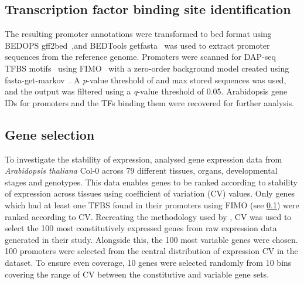 \subsection{Transcription factor binding site identification}
\label{chapter1:methods:transcription-factor-binding-site-identification}

The resulting promoter annotations were transformed to bed format using BEDOPS gff2bed~\autocite{nephBEDOPSHighperformanceGenomic2012},and BEDTools getfasta~\autocite{quinlanBEDToolsFlexibleSuite2010} was used to extract promoter sequences from the reference genome.
Promoters were scanned for DAP\hyp{}seq TFBS motifs~\autocite{omalleyCistromeEpicistromeFeatures2016} using FIMO~\autocite{grantFIMOScanningOccurrences2011} with a zero\hyp{}order background model created using fasta\hyp{}get\hyp{}markov~\autocite{baileyMEMESuiteTools2009}.
A \textit{p}\hyp{}value threshold of  and max stored sequences  was used, and the output was filtered using a \textit{q}\hyp{}value threshold of 0.05.
Arabidopsis gene IDs for promoters and the TFs binding them were recovered for further analysis.

\subsection{Gene selection}\label{chapter1:methods:gene-selection}

To investigate the stability of expression, \textcite*{czechowskiGenomeWideIdentificationTesting2005} analysed gene expression data from \textit{Arabidopsis thaliana} Col-0 across 79 different tissues, organs, developmental stages and genotypes.
This data enables genes to be ranked according to stability of expression across tissues using coefficient of variation (CV) values.
Only genes which had at least one TFBS found in their promoters using FIMO (see \ref{chapter1:methods:transcription-factor-binding-site-identification}) were ranked according to CV.
Recreating the methodology used by \textcite*{czechowskiGenomeWideIdentificationTesting2005}, CV was used to select the 100 most constitutively expressed genes from raw expression data generated in their study.
Alongside this, the 100 most variable genes were chosen.
100 promoters were selected from the central distribution of expression CV in the \textcite*{czechowskiGenomeWideIdentificationTesting2005} dataset.
To ensure even coverage, 10 genes were selected randomly from 10 bins covering the range of CV between the constitutive and variable gene sets.


